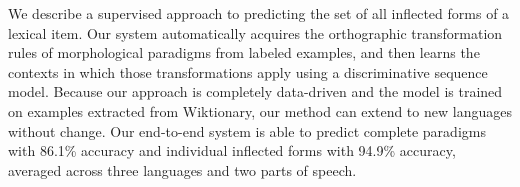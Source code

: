We describe a supervised approach to predicting the set of all inflected forms of a lexical item. Our system automatically acquires the orthographic
 transformation rules of morphological paradigms from labeled examples, and then
 learns the contexts in which those transformations apply using a discriminative
 sequence model. Because our approach is completely data-driven and the model is
 trained on examples extracted from Wiktionary, our method can extend to new
 languages without change. Our end-to-end system is able to predict complete
 paradigms with 86.1\% accuracy and individual inflected forms with 94.9\%
 accuracy, averaged across three languages and two parts of speech.

